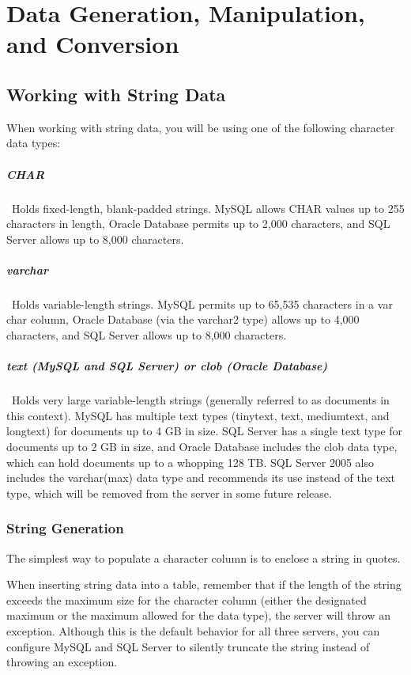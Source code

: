 \chapter{Data Generation, Manipulation, and Conversion\label{Ch07}}

\section{Working with String Data}
When working with string data, you will be using one of the following character data types:
\paragraph{CHAR}~Holds fixed-length, blank-padded strings. MySQL allows CHAR values up to 255 characters in length, Oracle Database permits up to 2,000 characters, and SQL Server allows up to 8,000 characters.

\paragraph{varchar}~Holds variable-length strings. MySQL permits up to 65,535 characters in a var char column, Oracle Database (via the varchar2 type) allows up to 4,000 characters, and SQL Server allows up to 8,000 characters.

\paragraph{text (MySQL and SQL Server) or clob (Oracle Database)}~Holds very large variable-length strings (generally referred to as documents in this context). MySQL has multiple text types (tinytext, text, mediumtext, and longtext) for documents up to 4 GB in size. SQL Server has a single text type for documents up to 2 GB in size, and Oracle Database includes the clob data type, which can hold documents up to a whopping 128 TB. SQL Server 2005 also includes the varchar(max) data type and recommends its use instead of the text type, which will be removed from the server in some future release.

\subsection{String Generation}
The simplest way to populate a character column is to enclose a string in quotes.

When inserting string data into a table, remember that if the length of the string exceeds the maximum size for the character column (either the designated maximum or the maximum allowed for the data type), the server will throw an exception. Although this is the default behavior for all three servers, you can configure MySQL and SQL Server to silently truncate the string instead of throwing an exception.

